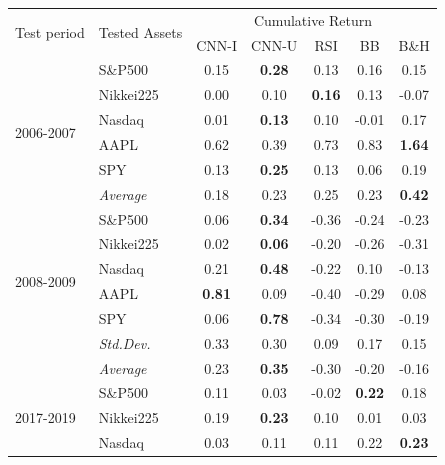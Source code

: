 \documentclass[12pt, a4paper]{article}
\begin{document}
\begin{table}[H]
\centering
\begin{tabular}{l|l|ccccc}
\multicolumn{1}{m{1cm}|}{\multirow{2}{1cm}{Test period}} & \multicolumn{1}{m{1.5cm}|}{\multirow{2}{1.5cm}{Tested Assets}} &       \multicolumn{5}{c}{Cumulative Return}  \\ \cline{3-7}
  &                  &  CNN-I         & CNN-U         & RSI           & BB            & B\&H \\ \hline \hline
\multirow{6}{1cm}{2006-2007}  & S\&P500          & 0.15              & \textbf{0.28} & 0.13          & 0.16          & 0.15          \\
  & Nikkei225        & 0.00              & 0.10          & \textbf{0.16} & 0.13          & -0.07         \\
  & Nasdaq           & 0.01              & \textbf{0.13} & 0.10          & -0.01         & 0.17          \\
  & AAPL             & 0.62              & 0.39          & 0.73          & 0.83          & \textbf{1.64} \\
  & SPY              & 0.13              & \textbf{0.25} & 0.13          & 0.06          & 0.19          \\ \cline{2-7}
  & \textit{Average} & 0.18              & 0.23          & 0.25          & 0.23          & \textbf{0.42} \\ \hline
\multirow{6}{1cm}{2008-2009} & S\&P500           & 0.06 & \textbf{0.34} & -0.36 & -0.24 & -0.23 \\
 & Nikkei225         & 0.02 &\textbf{0.06} & -0.20 & -0.26 & -0.31 \\
 & Nasdaq            & 0.21 & \textbf{0.48} & -0.22 & 0.10  & -0.13 \\
 & AAPL              & \textbf{0.81} & 0.09 & -0.40 & -0.29 & 0.08  \\
 & SPY               & 0.06 & \textbf{0.78} & -0.34 & -0.30 & -0.19 \\ \cline{2-7} 
 & \textit{Std.Dev.} & 0.33 & 0.30 & 0.09  & 0.17  & 0.15  \\ \cline{2-7} 
 & \textit{Average}  & 0.23 & \textbf{0.35} & -0.30 & -0.20 & -0.16 \\ \hline
\multirow{6}{1cm}{2017-2019} &  S\&P500          & 0.11              & 0.03          & -0.02         & \textbf{0.22} & 0.18          \\
  & Nikkei225        & 0.19              & \textbf{0.23} & 0.10          & 0.01          & 0.03          \\
  & Nasdaq           & 0.03              & 0.11          & 0.11          & 0.22          & \textbf{0.23} \\

\end{tabular}
\end{table}
\end{document}
